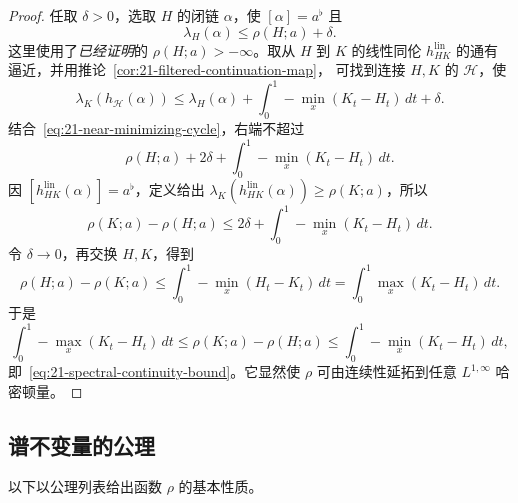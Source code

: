 \begin{proof}
任取 $\delta>0$，选取 $H$ 的闭链 $\alpha$，使 $[\alpha]=a^\flat$ 且
\begin{equation}
 \lambda_H(\alpha)\leq\rho(H;a)+\delta.
 \label{eq:21-near-minimizing-cycle}
\end{equation}
这里使用了\emph{已经证明}的 $\rho(H;a)>-\infty$。取从 $H$ 到 $K$ 的线性同伦
$h_{HK}^{\mathrm{lin}}$ 的通有逼近，并用推论~\ref{cor:21-filtered-continuation-map}，
可找到连接 $H,K$ 的 $\mathcal H$，使
\[
 \lambda_K(h_\mathcal H(\alpha))
 \leq\lambda_H(\alpha)+\int_0^1-\min_x(K_t-H_t)\,dt+\delta.
\]
结合~\eqref{eq:21-near-minimizing-cycle}，右端不超过
\[
 \rho(H;a)+2\delta+\int_0^1-\min_x(K_t-H_t)\,dt.
\]
因 $[h_{HK}^{\mathrm{lin}}(\alpha)]=a^\flat$，定义给出
$\lambda_K(h_{HK}^{\mathrm{lin}}(\alpha))\geq\rho(K;a)$，所以
\[
 \rho(K;a)-\rho(H;a)
 \leq2\delta+\int_0^1-\min_x(K_t-H_t)\,dt.
\]
令 $\delta\to0$，再交换 $H,K$，得到
\[
 \rho(H;a)-\rho(K;a)
 \leq\int_0^1-\min_x(H_t-K_t)\,dt
 =\int_0^1\max_x(K_t-H_t)\,dt.
\]
于是
\[
 \int_0^1-\max_x(K_t-H_t)\,dt
 \leq\rho(K;a)-\rho(H;a)
 \leq\int_0^1-\min_x(K_t-H_t)\,dt,
\]
即~\eqref{eq:21-spectral-continuity-bound}。它显然使 $\rho$ 可由连续性延拓到任意
$L^{1,\infty}$ 哈密顿量。
\end{proof}

\subsection{谱不变量的公理}

以下以公理列表给出函数 $\rho$ 的基本性质。

